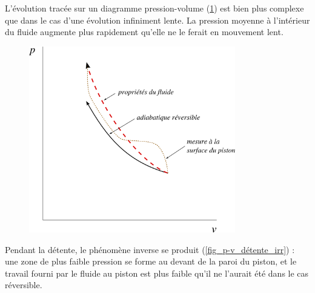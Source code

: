 		L’évolution tracée sur un diagramme pression-volume (\cref{fig_p-v_compression_irr}) est bien plus complexe que dans le cas d’une évolution infiniment lente. La pression moyenne à l’intérieur du fluide augmente plus rapidement qu’elle ne le ferait en mouvement lent.

		\begin{figure}
			\begin{center}
				\includegraphics[width=9cm]{images/pv_compression_irreversible.png}
			\end{center}
			\label{fig_p-v_compression_irr}
		\end{figure}

		Pendant la détente, le phénomène inverse se produit (\cref{fig_p-v_détente_irr}) : une zone de plus faible pression se forme au devant de la paroi du piston, et le travail fourni par le fluide au piston est plus faible qu’il ne l’aurait été dans le cas réversible.

